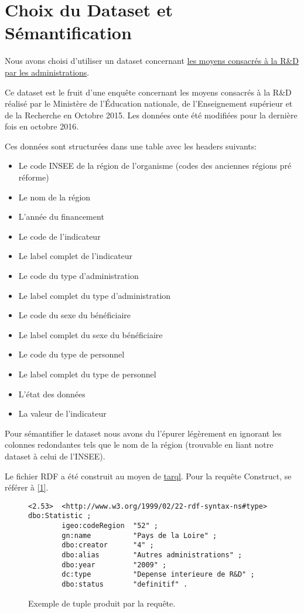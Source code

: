 \chapter{Choix du Dataset et Sémantification}

Nous avons choisi d'utiliser un dataset concernant \href{https://data.enseignementsup-recherche.gouv.fr/explore/dataset/fr-esr-rd-moyens-administrations-type-organisme/}{les moyens consacrés à la R\&D par les administrations}.

Ce dataset est le fruit d'une enquête concernant les moyens consacrés à la R\&D réalisé par le Ministère de l'Éducation nationale, de l'Enseignement supérieur et de la Recherche en Octobre 2015. Les données onte été modifiées pour la dernière fois en octobre 2016.

Ces données sont structurées dans une table avec les headers suivants:
\begin{itemize}
    \item Le code INSEE de la région de l'organisme (codes des anciennes régions pré réforme)
    \item Le nom de la région
    \item L'année du financement
    \item Le code de l'indicateur
    \item Le label complet de l'indicateur
    \item Le code du type d'administration
    \item Le label complet du type d'administration
    \item Le code du sexe du bénéficiaire
    \item Le label complet du sexe du bénéficiaire
    \item Le code du type de personnel
    \item Le label complet du type de personnel
    \item L'état des données
    \item La valeur de l'indicateur
\end{itemize}

\vskip1cm

Pour sémantifier le dataset nous avons du l'épurer légèrement en ignorant les colonnes redondantes tels que le nom de la région (trouvable en liant notre dataset à celui de l'INSEE).

Le fichier RDF a été construit au moyen de \href{https://tarql.github.io/}{tarql}. Pour la requête Construct, se référer à \autoref{1}.

\begin{figure}[b]
\begin{lstlisting}
<2.53>  <http://www.w3.org/1999/02/22-rdf-syntax-ns#type>  dbo:Statistic ;
        igeo:codeRegion  "52" ;
        gn:name          "Pays de la Loire" ;
        dbo:creator      "4" ;
        dbo:alias        "Autres administrations" ;
        dbo:year         "2009" ;
        dc:type          "Depense interieure de R&D" ;
        dbo:status       "definitif" .
\end{lstlisting}
\caption{Exemple de tuple produit par la requête.}
\end{figure}


